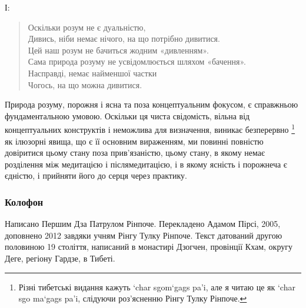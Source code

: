 \documentclass{article}
\begin{document}
І:

\begin{verse}
        Оскільки розум не є дуальністю, \\
        Дивись, ніби немає нічого, на що потрібно дивитися. \\
        Цей наш розум не бачиться жодним «дивленням». \\
        Сама природа розуму не усвідомлюється шляхом «бачення». \\
        Насправді, немає найменшої частки \\
        Чогось, на що можна дивитися.
\end{verse}

Природа розуму, порожня і ясна та поза концептуальним фокусом,
є справжньою фундаментальною умовою. Оскільки ця чиста свідомість,
вільна від концептуальних конструктів і неможлива для визначення,
виникає безперервно \footnote{Різні тибетські видання кажуть ‘char sgom‘gags pa’i, але я читаю це як ‘char sgo ma‘gags pa’i, слідуючи роз’ясненню Рінгу Тулку Рінпоче.} як ілюзорні явища, що є її основним вираженням,
ми повинні повністю довіритися цьому стану поза прив’язаністю,
цьому стану, в якому немає розділення між медитацією і післямедитацією,
і в якому ясність і порожнеча є єдністю, і прийняти його до серця через практику.

\vspace{1cm}

\subsubsection*{Колофон}
\footnotesize
Написано Першим Дза Патрулом Рінпоче. Перекладено Адамом Пірсі, 2005, доповнено 2012 завдяки учням Рінгу Тулку Рінпоче.
Текст датований другою половиною 19 століття, написаний в монастирі Дзогчен, провінції Кхам, округу Деге, регіону Гардзе, в Тибеті.

\end{document}
